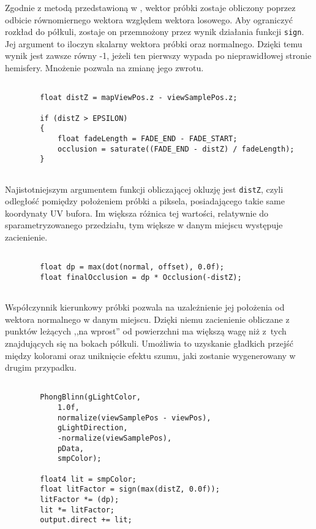 		Zgodnie z metodą przedstawioną w \cite{luna}, wektor próbki zostaje obliczony poprzez odbicie równomiernego wektora względem wektora losowego. Aby ograniczyć rozkład do półkuli, zostaje on przemnożony przez wynik działania funkcji \texttt{sign}. Jej argument to iloczyn skalarny wektora próbki oraz normalnego. Dzięki temu wynik jest zawsze równy -1, jeżeli ten pierwszy wypada po nieprawidłowej stronie hemisfery. Mnożenie pozwala na zmianę jego zwrotu.
		
		\begin{lstlisting}[language=HLSL,caption={Obliczenie współczynnika okluzji (funkcja Occlusion).},label={lst_6_C}]
		
		float distZ = mapViewPos.z - viewSamplePos.z;
		
		if (distZ > EPSILON)
		{
			float fadeLength = FADE_END - FADE_START;
			occlusion = saturate((FADE_END - distZ) / fadeLength);
		}
		
		\end{lstlisting}
		
		Najistotniejszym argumentem funkcji obliczającej okluzję jest \texttt{distZ}, czyli odległość pomiędzy położeniem próbki a piksela, posiadającego takie same koordynaty UV bufora. Im większa różnica tej wartości, relatywnie do sparametryzowanego przedziału, tym większe w danym miejscu występuje zacienienie.
		
		\begin{lstlisting}[language=HLSL,caption={Uwzględnienie współczynnika kierunkowego.},label={lst_6_D}]
		
		float dp = max(dot(normal, offset), 0.0f);
		float finalOcclusion = dp * Occlusion(-distZ);
		
		\end{lstlisting}
		
		Współczynnik kierunkowy próbki pozwala na uzależnienie jej położenia od wektora normalnego w danym miejscu. Dzięki niemu zacienienie obliczane z punktów leżących ,,na wprost'' od powierzchni ma większą wagę niż z~tych znajdujących się na bokach półkuli. Umożliwia to uzyskanie gładkich przejść między kolorami oraz uniknięcie efektu szumu, jaki zostanie wygenerowany w drugim przypadku.
		
		\begin{lstlisting}[language=HLSL,caption={Obliczenie oświetlenia bezpośredniego SSDO-A.},label={lst_6_E}]
		
		PhongBlinn(gLightColor,
			1.0f,
			normalize(viewSamplePos - viewPos),
			gLightDirection,
			-normalize(viewSamplePos),
			pData,
			smpColor);
		
		float4 lit = smpColor;
		float litFactor = sign(max(distZ, 0.0f));
		litFactor *= (dp);
		lit *= litFactor;
		output.direct += lit;
		
		\end{lstlisting}
		
